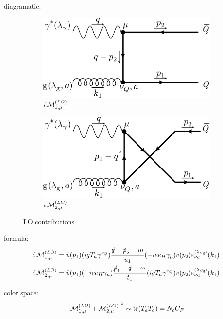 diagramatic:
\begin{figure}[ht!]
	\centering
	\begin{subfigure}[t]{.4\textwidth}
		\includegraphics[width=\textwidth]{pyfeyn/lo-a}
		\caption{$i\operatorname{\mathcal M}^{(LO)}_{1,\mu}$}
	\end{subfigure}\hspace{.15\textwidth}%
	\begin{subfigure}[t]{.4\textwidth}
		\includegraphics[width=\textwidth]{pyfeyn/lo-b}
		\caption{$i\operatorname{\mathcal M}^{(LO)}_{2,\mu}$}
	\end{subfigure}
	\caption{LO contributions}\label{fig:FeynLO}
\end{figure}

formula:
\begin{align}
i\Md^{(LO)}_{1,\mu} &= \bar u(p_1)(igT_a\gamma^{\nu_Q})\frac{\slashed{q}-\slashed{p}_2-m}{u_1}(-i e e_H \gamma_\mu)v(p_2)\varepsilon^{(\lambda_{\Pg})}_{\nu_Q}(k_1)\\
i\Md^{(LO)}_{2,\mu} &= \bar u(p_1)(-i e e_H \gamma_\mu)\frac{\slashed{p}_1-\slashed{q}-m}{t_1}(igT_a\gamma^{\nu_Q})v(p_2)\varepsilon^{(\lambda_{\Pg})}_{\nu_Q}(k_1)
\end{align}

color space:
\begin{equation}
\left|\operatorname{\mathcal M}^{(LO)}_{1,\mu}+\operatorname{\mathcal M}^{(LO)}_{2,\mu}\right|^2 \sim \operatorname{\text{tr}}(T_a T_a) = N_c C_F
\end{equation}

